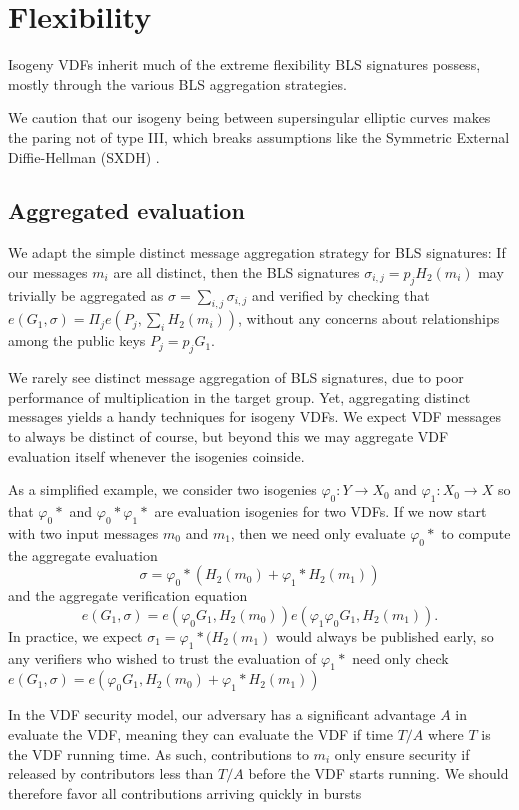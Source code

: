 \documentclass{article}
\newcommand\mathperiod{.}
\begin{document}
\section{Flexibility}

Isogeny VDFs inherit much of the extreme flexibility BLS signatures
possess, mostly through the various BLS aggregation strategies.

We caution that our isogeny being between supersingular elliptic
curves makes the paring not of type III, which breaks assumptions
like the Symmetric External Diffie-Hellman (SXDH) \cite{ordinary_cocks_pinch}.

\subsection{Aggregated evaluation}

We adapt the simple distinct message aggregation strategy for
BLS signatures:  If our messages $m_i$ are all distinct, then the
BLS signatures $\sigma_{i,j} = p_j H_2(m_i)$ may trivially be
aggregated as $\sigma = \sum_{i,j} \sigma_{i,j}$ and verified by
checking that $e(G_1,\sigma) = \Pi_j e(P_j, \sum_i H_2(m_i))$,
without any concerns about relationships among the public keys
$P_j = p_j G_1$.  

We rarely see distinct message aggregation of BLS signatures, due to
poor performance of multiplication in the target group.  
Yet, aggregating distinct messages yields a handy techniques for
isogeny VDFs.  We expect VDF messages to always be distinct of course,
but beyond this we may aggregate VDF evaluation itself whenever the
isogenies coinside.

As a simplified example,
we consider two isogenies $φ_0 : Y \to X_0$ and $φ_1 : X_0 \to X$
so that $φ_0*$ and $φ_0* φ_1*$ are evaluation isogenies for  %
two VDFs.  If we now start with two input messages $m_0$ and $m_1$,
then we need only evaluate $φ_0*$ to compute the aggregate evaluation
$$ \sigma = φ_0*( H_2(m_0) + φ_1* H_2(m_1) )$$
and the aggregate verification equation
$$ e(G_1,\sigma) = e(φ_0 G_1, H_2(m_0)) e(φ_1 φ_0 G_1, H_2(m_1)) \mathperiod $$
In practice, we expect $\sigma_1 = φ_1*(H_2(m_1)$ would always be
published early, so any verifiers who wished to trust the evaluation
of $φ_1*$ need only check 
$e(G_1,\sigma) = e(φ_0 G_1, H_2(m_0) + φ_1* H_2(m_1))$

In the VDF security model, our adversary has a significant advantage
$A$ in evaluate the VDF, meaning they can evaluate the VDF if time
$T/A$ where $T$ is the VDF running time.  As such, contributions to
$m_i$ only ensure security if released by contributors less than
$T/A$ before the VDF starts running.  We should therefore favor all
contributions arriving quickly in bursts
\end{document}
